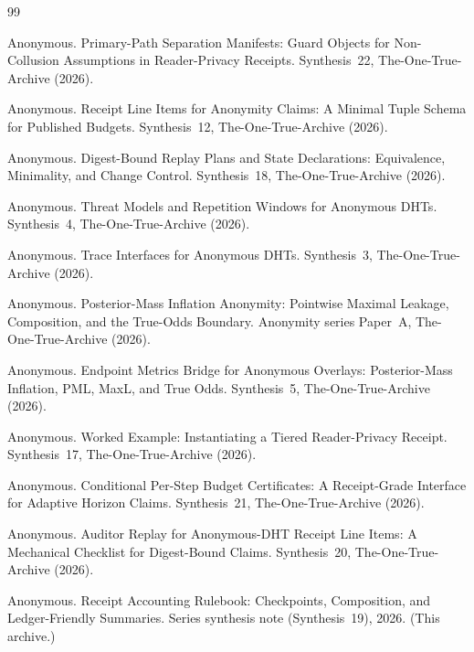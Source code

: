 \documentclass[11pt]{article}
\begin{document}
\begin{thebibliography}{99}\small

Anonymous.
\newblock Primary-Path Separation Manifests: Guard Objects for Non-Collusion Assumptions in Reader-Privacy Receipts.
\newblock Synthesis~22, The-One-True-Archive (2026).

Anonymous.
\newblock Receipt Line Items for Anonymity Claims: A Minimal Tuple Schema for Published Budgets.
\newblock Synthesis~12, The-One-True-Archive (2026).

Anonymous.
\newblock Digest-Bound Replay Plans and State Declarations: Equivalence, Minimality, and Change Control.
\newblock Synthesis~18, The-One-True-Archive (2026).

Anonymous.
\newblock Threat Models and Repetition Windows for Anonymous DHTs.
\newblock Synthesis~4, The-One-True-Archive (2026).

Anonymous.
\newblock Trace Interfaces for Anonymous {DHT}s.
\newblock Synthesis~3, The-One-True-Archive (2026).

Anonymous.
\newblock Posterior-Mass Inflation Anonymity: Pointwise Maximal Leakage, Composition, and the True-Odds Boundary.
\newblock Anonymity series Paper~A, The-One-True-Archive (2026).

Anonymous.
\newblock Endpoint Metrics Bridge for Anonymous Overlays: Posterior-Mass Inflation, PML, MaxL, and True Odds.
\newblock Synthesis~5, The-One-True-Archive (2026).

Anonymous.
\newblock Worked Example: Instantiating a Tiered Reader-Privacy Receipt.
\newblock Synthesis~17, The-One-True-Archive (2026).

Anonymous.
\newblock Conditional Per-Step Budget Certificates: A Receipt-Grade Interface for Adaptive Horizon Claims.
\newblock Synthesis~21, The-One-True-Archive (2026).

Anonymous.
\newblock Auditor Replay for Anonymous-DHT Receipt Line Items: A Mechanical Checklist for Digest-Bound Claims.
\newblock Synthesis~20, The-One-True-Archive (2026).


Anonymous.
\newblock Receipt Accounting Rulebook: Checkpoints, Composition, and Ledger-Friendly Summaries.
\newblock Series synthesis note (Synthesis~19), 2026. (This archive.)

\end{thebibliography}
\end{document}
